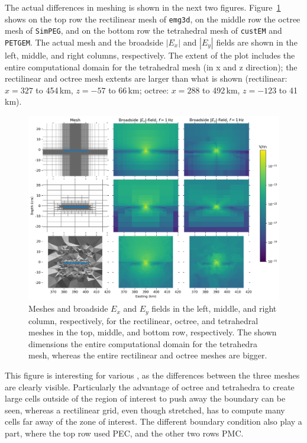 \documentclass[extra, camera,%
]{gji}
\newcommand{\emg}[2]{\texttt{emg#1#2}\xspace}
\newcommand{\simpeg}{\texttt{SimPEG}\xspace}
\newcommand{\custem}{\texttt{custEM}\xspace}
\newcommand{\petgem}{\texttt{PETGEM}\xspace}
\begin{document}
The actual differences in meshing is shown in the next two figures. Figure~\ref{fig:results-marlim_big} shows on the top row the rectilinear mesh of \emg3d, on the middle row the octree mesh of \simpeg, and on the bottom row the tetrahedral mesh of \custem and \petgem. The actual mesh and the broadside $|E_x|$ and $|E_y|$ fields are shown in the left, middle, and right columns, respectively. The extent of the plot includes the entire computational domain for the tetrahedral mesh (in x and z direction); the rectilinear and octree mesh extents are larger than what is shown (rectilinear: $x=327$ to 454\,km, $z=-57$ to 66\,km; octree: $x=288$ to 492\,km, $z=-123$ to 41\,km).
%
\begin{figure}
  \centering
  \includegraphics[width=.9\linewidth]{figures/results-marlim_big.png}
  \caption{Meshes and broadside $E_x$ and $E_y$ fields in the left, middle, and right column, respectively, for the rectilinear, octree, and tetrahedral meshes in the top, middle, and bottom row, respectively. The shown dimensions  the entire computational domain for the tetrahedra mesh, whereas the entire rectilinear and octree meshes are bigger.}
  \label{fig:results-marlim_big}
\end{figure}
%
This figure is interesting for various , as the differences between the three meshes are clearly visible. Particularly the advantage of octree and tetrahedra to create large cells outside of the region of interest to push away the boundary can be seen, whereas a rectilinear grid, even though stretched, has to compute many cells far away of the zone of interest. The different boundary condition also play a part, where the top row used PEC, and the other two rows PMC. 
\end{document}

